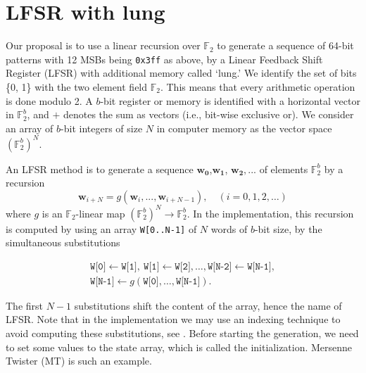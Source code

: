\documentclass{svmult}
\begin{document}
\section{LFSR with lung}
\label{sec:pulmonary}
Our proposal is to use a linear recursion over ${\mathbb F}_2$
to generate a sequence of 64-bit patterns with
12 MSBs being \texttt{0x3ff} as above,
by a Linear Feedback Shift Register (LFSR)
with additional memory called `lung.'
We identify the set of bits \{0, 1\} with the two element field ${\mathbb F}_2$.
This means that every arithmetic operation is done modulo 2.  
A $b$-bit register or memory is identified with a horizontal
vector in ${\mathbb F}_2^b$, and $+$ denotes the sum as vectors (i.e.,
bit-wise exclusive or). We consider an array of $b$-bit integers of
size $N$ in
computer memory as the vector space $({\mathbb F}_2^{b})^N$.

An LFSR method is to generate a sequence $\mathbf{w_0}$,$\mathbf{w_1}$,
$\mathbf{w_2},...$ of elements ${\mathbb F}_2^b$ by a recursion
\[ \mathbf{w}_{i+N} = g(\mathbf{w}_{i}, ..., \mathbf{w}_{i + N-1}), 
\quad (i=0,1,2,\ldots)
\]
where $g$ is an ${\mathbb F}_2$-linear map $({\mathbb F}_2^{b})^N \rightarrow
{\mathbb F}_2^b$.  In the implementation, this recursion is computed by using
an array \texttt{W[0..N-1]} of $N$ words of $b$-bit size, by the
simultaneous substitutions

\begin{multline*}
    \texttt{W[0]} \leftarrow \texttt{W[1]},\ 
    \texttt{W[1]} \leftarrow \texttt{W[2]}, \ldots,
    \texttt{W[N-2]} \leftarrow \texttt{W[N-1]}, \\  
    \texttt{W[N-1]} \leftarrow
    g(\texttt{W[0]},\ldots,\texttt{W[N-1]}). 
  \end{multline*}

The first $N-1$ substitutions shift the content of the array, hence
the name of LFSR.  Note that in the implementation we may use an
indexing technique to avoid computing these substitutions, see
\cite[P.28 Algorithm A]{knuth:bible}.  Before starting the generation,
we need to set some values to the state array, which is called the
initialization. Mersenne Twister \cite{MT} (MT) is such an example.
\end{document}
